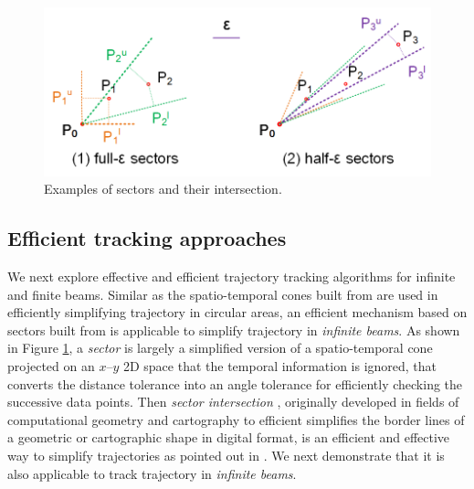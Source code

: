 \begin{figure}[tb!]
	\centering
	\includegraphics[scale=1.0]{figures/Fig-Sleeve.png}
	\vspace{-2ex}
	\caption{\small Examples of sectors and their intersection.}
	\vspace{-2ex}
	\label{fig:sleeve}
\end{figure}

\subsection{Efficient tracking approaches}
\label{sec:track_cone_sector}


We next explore effective and efficient trajectory tracking algorithms for infinite and finite beams.
%
Similar as the spatio-temporal cones built from \sed are used in efficiently simplifying trajectory in circular areas, an efficient mechanism based on sectors built from \ped is applicable to simplify trajectory in \emph{infinite beams}. As shown in Figure \ref{fig:sleeve}, a \emph{sector} is largely a simplified version of a spatio-temporal cone projected on an $x$--$y$ 2D space that the temporal information is ignored, that converts the \ped distance tolerance into an angle tolerance for efficiently checking the successive data points. 
Then \textit{sector intersection} \cite{Williams:Longest, Sklansky:Cone, Dunham:Cone, Zhao:Sleeve}, originally developed in fields of computational geometry and cartography to efficient simplifies the border lines of a geometric or cartographic shape in digital format, is an efficient and effective way to simplify trajectories as pointed out in \cite{Lin:Cised}.
We next demonstrate that it is also applicable to track trajectory in \emph{infinite beams}.


